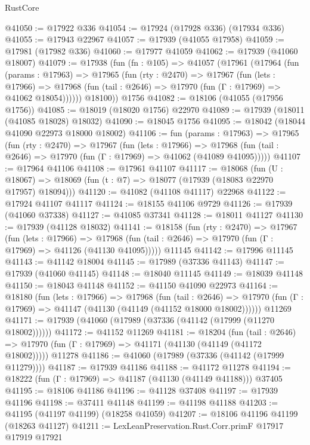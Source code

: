 \begin{lexlean}{RustCore}
\begin{coremodule}
@41050 := @17922 @336
@41054 := @17924 (@17928 @336) (@17934 @336)
@41055 := @17943 @22967
@41057 := @17939 (@41055 @17958)
@41059 := @17981 (@17982 @336)
@41060 := @17977 @41059
@41062 := @17939 (@41060 @18007)
@41079 := @17938
    (fun (fn : @105) =>
    @41057
      (@17961
        (@17964
          (fun (params : @17963) =>
          @17965
            (fun (rty : @2470) =>
            @17967
              (fun (lets : @17966) =>
              @17968 (fun (tail : @2646) => @17970 (fun (Γ : @17969) => @41062 @18054))))))
        @18100))
    @1756
@41082 := @18106 (@41055 (@17956 @1756))
@41085 := @18019 (@18020 @1756) @22970
@41089 := @17939 (@18011 (@41085 @18028) @18032)
@41090 := @18045 @1756
@41095 := @18042 (@18044 @41090 @22973 @18000 @18002)
@41106 := fun (params : @17963) =>
  @17965
    (fun (rty : @2470) =>
    @17967
      (fun (lets : @17966) =>
      @17968 (fun (tail : @2646) => @17970 (fun (Γ : @17969) => @41062 (@41089 @41095)))))
@41107 := @17964 @41106
@41108 := @17961 @41107
@41117 := @18068
    (fun (U : @18067) => @18069 (fun (t : @7) => @18077 (@17939 (@18083 @22970 @17957) @18094)))
@41120 := @41082 (@41108 @41117) @22968
@41122 := @17924 @41107 @41117
@41124 := @18155 @41106 @9729
@41126 := @17939 (@41060 @37338)
@41127 := @41085 @37341
@41128 := @18011 @41127
@41130 := @17939 (@41128 @18032)
@41141 := @18158
    (fun (rty : @2470) =>
    @17967
      (fun (lets : @17966) =>
      @17968 (fun (tail : @2646) => @17970 (fun (Γ : @17969) => @41126 (@41130 @41095)))))
    @11145
@41142 := @17996 @11145
@41143 := @41142 @18004
@41145 := @17989 (@37336 @41143)
@41147 := @17939 (@41060 @41145)
@41148 := @18040 @11145
@41149 := @18039 @41148
@41150 := @18043 @41148
@41152 := @41150 @41090 @22973
@41164 := @18180
    (fun (lets : @17966) =>
    @17968
      (fun (tail : @2646) =>
      @17970 (fun (Γ : @17969) => @41147 (@41130 (@41149 (@41152 @18000 @18002))))))
    @11269
@41171 := @17939 (@41060 (@17989 (@37336 (@41142 (@17999 (@11270 @18002))))))
@41172 := @41152 @11269
@41181 := @18204
    (fun (tail : @2646) => @17970 (fun (Γ : @17969) => @41171 (@41130 (@41149 (@41172 @18002)))))
    @11278
@41186 := @41060 (@17989 (@37336 (@41142 (@17999 @11279))))
@41187 := @17939 @41186
@41188 := @41172 @11278
@41194 := @18222 (fun (Γ : @17969) => @41187 (@41130 (@41149 @41188))) @37405
@41195 := @18106 @41186
@41196 := @41128 @37408
@41197 := @17939 @41196
@41198 := @37411 @41148
@41199 := @41198 @41188
@41203 := @41195 (@41197 @41199) (@18258 @41059)
@41207 := @18106 @41196 @41199 (@18263 @41127)
@41211 := LexLeanPreservation.Rust.Corr.primF @17917 @17919 @17921

\end{coremodule}
\end{lexlean}
